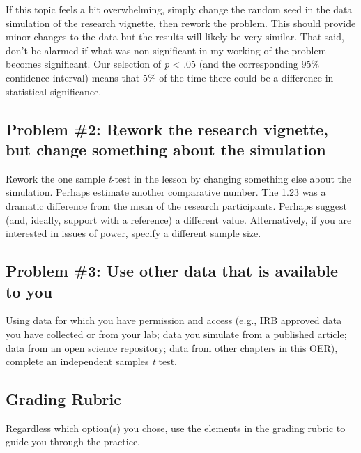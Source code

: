 \documentclass[
  11pt,
]{book}
\begin{document}
If this topic feels a bit overwhelming, simply change the random seed in the data simulation of the research vignette, then rework the problem. This should provide minor changes to the data but the results will likely be very similar. That said, don't be alarmed if what was non-significant in my working of the problem becomes significant. Our selection of \emph{p} \textless{} .05 (and the corresponding 95\% confidence interval) means that 5\% of the time there could be a difference in statistical significance.

\hypertarget{problem-2-rework-the-research-vignette-but-change-something-about-the-simulation}{%
\subsection{Problem \#2: Rework the research vignette, but change something about the simulation}\label{problem-2-rework-the-research-vignette-but-change-something-about-the-simulation}}

Rework the one sample \emph{t}-test in the lesson by changing something else about the simulation. Perhaps estimate another comparative number. The 1.23 was a dramatic difference from the mean of the research participants. Perhaps suggest (and, ideally, support with a reference) a different value. Alternatively, if you are interested in issues of power, specify a different sample size.

\hypertarget{problem-3-use-other-data-that-is-available-to-you}{%
\subsection{Problem \#3: Use other data that is available to you}\label{problem-3-use-other-data-that-is-available-to-you}}

Using data for which you have permission and access (e.g., IRB approved data you have collected or from your lab; data you simulate from a published article; data from an open science repository; data from other chapters in this OER), complete an independent samples \emph{t} test.

\hypertarget{grading-rubric}{%
\subsection{Grading Rubric}\label{grading-rubric}}

Regardless which option(s) you chose, use the elements in the grading rubric to guide you through the practice.
\end{document}

